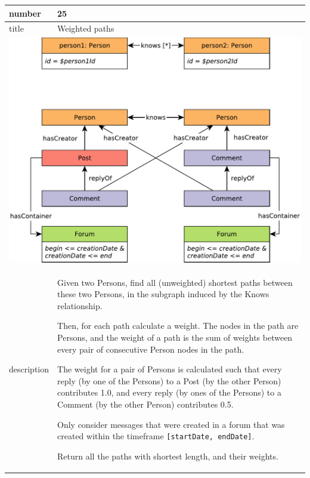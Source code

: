 \renewcommand*{\arraystretch}{1.5}
\noindent\begin{tabularx}{17cm}{|p{1.95cm}|X|}
	\hline
	number      & 25                                                          \\ \hline
	title       & Weighted paths                                                           \\ \hline
	\multicolumn{2}{|c|}{ \includegraphics[scale=\patternscale,margin=0cm .2cm]{patterns/q25}} \\ \hline
	description & Given two Persons, find all (unweighted) shortest paths between these
two Persons, in the subgraph induced by the Knows relationship.

Then, for each path calculate a weight. The nodes in the path are
Persons, and the weight of a path is the sum of weights between every
pair of consecutive Person nodes in the path.

The weight for a pair of Persons is calculated such that every reply (by
one of the Persons) to a Post (by the other Person) contributes 1.0, and
every reply (by ones of the Persons) to a Comment (by the other Person)
contributes 0.5.

Only consider messages that were created in a forum that was created
within the timeframe \texttt{{[}startDate,\ endDate{]}}.

Return all the paths with shortest length, and their weights.
 \\ \hline
	

\end{tabularx}
